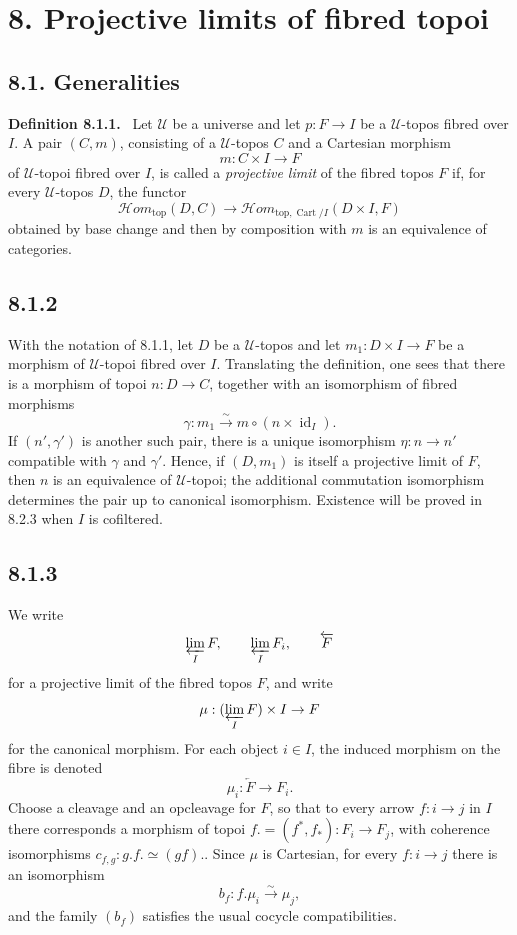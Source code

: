 \documentclass[11pt]{article}
\newcommand{\U}{\mathcal{U}}
\newcommand{\id}{\operatorname{id}}
\newcommand{\Cart}{\operatorname{Cart}}
\newenvironment{statement}[1]{\par\medskip\noindent\textbf{#1.}\ }{\par\medskip}
\begin{document}
\section*{8. Projective limits of fibred topoi}

\subsection*{8.1. Generalities}

\begin{statement}{Definition 8.1.1}
Let \(\U\) be a universe and let \(p:F\to I\) be a \(\U\)-topos fibred over \(I\). A pair \((C,m)\), consisting of a \(\U\)-topos \(C\) and a Cartesian morphism
\[
 m:C\times I\longrightarrow F
\]
of \(\U\)-topoi fibred over \(I\), is called a \emph{projective limit} of the fibred topos \(F\) if, for every \(\U\)-topos \(D\), the functor
\[
 \mathcal{H}om_{\mathrm{top}}(D,C)\to
 \mathcal{H}om_{\mathrm{top},\Cart/I}(D\times I,F) \tag{8.1.1.1}
\]
obtained by base change and then by composition with \(m\) is an equivalence of categories.
\end{statement}

\subsection*{8.1.2}
With the notation of 8.1.1, let \(D\) be a \(\U\)-topos and let \(m_1:D\times I\to F\) be a morphism of \(\U\)-topoi fibred over \(I\). Translating the definition, one sees that there is a morphism of topoi \(n:D\to C\), together with an isomorphism of fibred morphisms
\[
 \gamma:m_1\xrightarrow{\sim}m\circ(n\times\id_I).
\]
If \((n',\gamma')\) is another such pair, there is a unique isomorphism \(\eta:n\to n'\) compatible with \(\gamma\) and \(\gamma'\). Hence, if \((D,m_1)\) is itself a projective limit of \(F\), then \(n\) is an equivalence of \(\U\)-topoi; the additional commutation isomorphism determines the pair up to canonical isomorphism. Existence will be proved in 8.2.3 when \(I\) is cofiltered.

\subsection*{8.1.3}
We write
\[
 \varprojlim_I F,\qquad \varprojlim_I F_i,\qquad \overleftarrow F
\]
for a projective limit of the fibred topos \(F\), and write
\[
 \mu:(\varprojlim_I F)\times I\to F
\]
for the canonical morphism. For each object \(i\in I\), the induced morphism on the fibre is denoted
\[
 \mu_i:\overleftarrow F\to F_i.
\]
Choose a cleavage and an opcleavage for \(F\), so that to every arrow \(f:i\to j\) in \(I\) there corresponds a morphism of topoi \(f.=(f^*,f_*):F_i\to F_j\), with coherence isomorphisms \(c_{f,g}:g.f.\simeq(gf).\). Since \(\mu\) is Cartesian, for every \(f:i\to j\) there is an isomorphism
\[
 b_f:f.\mu_i\xrightarrow{\sim}\mu_j, \tag{8.1.3.1}
\]
and the family \((b_f)\) satisfies the usual cocycle compatibilities.
\end{document}
